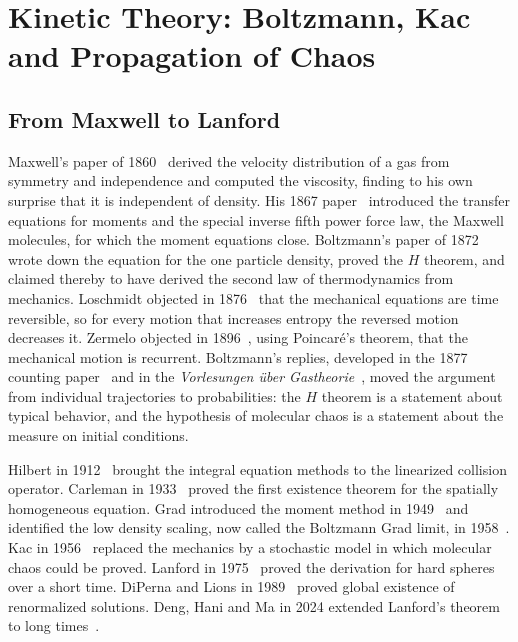 \chapter{Kinetic Theory: Boltzmann, Kac and Propagation of Chaos}
\label{ch:kinetic}

\section{From Maxwell to Lanford}

Maxwell's paper of 1860~\cite{maxwell1860} derived the velocity distribution of a gas from symmetry and independence and computed the viscosity, finding to his own surprise that it is independent of density. His 1867 paper~\cite{maxwell1867} introduced the transfer equations for moments and the special inverse fifth power force law, the Maxwell molecules, for which the moment equations close. Boltzmann's paper of 1872~\cite{boltzmann1872} wrote down the equation for the one particle density, proved the $H$ theorem, and claimed thereby to have derived the second law of thermodynamics from mechanics. Loschmidt objected in 1876~\cite{loschmidt1876} that the mechanical equations are time reversible, so for every motion that increases entropy the reversed motion decreases it. Zermelo objected in 1896~\cite{zermelo1896}, using Poincar\'e's theorem, that the mechanical motion is recurrent. Boltzmann's replies, developed in the 1877 counting paper~\cite{boltzmann1877} and in the \emph{Vorlesungen \"uber Gastheorie}~\cite{boltzmann1896}, moved the argument from individual trajectories to probabilities: the $H$ theorem is a statement about typical behavior, and the hypothesis of molecular chaos is a statement about the measure on initial conditions.

Hilbert in 1912~\cite{hilbert1912} brought the integral equation methods to the linearized collision operator. Carleman in 1933~\cite{carleman1933} proved the first existence theorem for the spatially homogeneous equation. Grad introduced the moment method in 1949~\cite{grad1949} and identified the low density scaling, now called the Boltzmann Grad limit, in 1958~\cite{grad1958}. Kac in 1956~\cite{kac1956} replaced the mechanics by a stochastic model in which molecular chaos could be proved. Lanford in 1975~\cite{lanford1975} proved the derivation for hard spheres over a short time. DiPerna and Lions in 1989~\cite{diperna1989} proved global existence of renormalized solutions. Deng, Hani and Ma in 2024 extended Lanford's theorem to long times~\cite{denghanima2024}.

